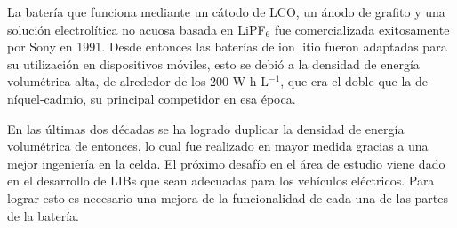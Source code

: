 La batería que funciona mediante un cátodo de LCO, un ánodo de grafito y una
solución electrolítica no acuosa basada en LiPF$_6$ fue comercializada
exitosamente por Sony en 1991. Desde entonces las baterías de ion litio fueron
adaptadas para su utilización en dispositivos móviles, esto se debió a la
densidad de energía volumétrica alta, de alrededor de los 200 W h L$^{-1}$, que
era el doble que la de níquel-cadmio, su principal competidor en esa época.

En las últimas dos décadas se ha logrado duplicar la densidad de energía 
volumétrica de entonces, lo cual fue realizado en mayor medida gracias a una 
mejor ingeniería en la celda. El próximo desafío en el área de estudio viene 
dado en el desarrollo de LIBs que sean adecuadas para los vehículos eléctricos. 
Para lograr esto es necesario una mejora de la funcionalidad de cada una de las
partes de la batería.

